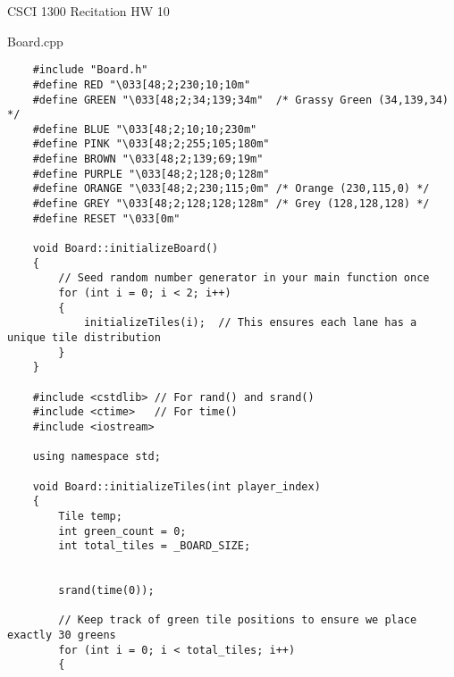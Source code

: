 \documentclass{article}
\begin{document}
CSCI 1300 Recitation HW 10

\vspace{1cm}

Board.cpp

\begin{verbatim}
    #include "Board.h"
    #define RED "\033[48;2;230;10;10m"
    #define GREEN "\033[48;2;34;139;34m"  /* Grassy Green (34,139,34) */
    #define BLUE "\033[48;2;10;10;230m"
    #define PINK "\033[48;2;255;105;180m"
    #define BROWN "\033[48;2;139;69;19m"
    #define PURPLE "\033[48;2;128;0;128m"
    #define ORANGE "\033[48;2;230;115;0m" /* Orange (230,115,0) */
    #define GREY "\033[48;2;128;128;128m" /* Grey (128,128,128) */
    #define RESET "\033[0m"
    
    void Board::initializeBoard()
    {
        // Seed random number generator in your main function once
        for (int i = 0; i < 2; i++)
        {
            initializeTiles(i);  // This ensures each lane has a unique tile distribution
        }
    }
    
    #include <cstdlib> // For rand() and srand()
    #include <ctime>   // For time()
    #include <iostream>
    
    using namespace std;
    
    void Board::initializeTiles(int player_index)
    {
        Tile temp;
        int green_count = 0;
        int total_tiles = _BOARD_SIZE;
        
    
        srand(time(0));
        
        // Keep track of green tile positions to ensure we place exactly 30 greens
        for (int i = 0; i < total_tiles; i++)
        {
            

\end{verbatim}
\end{document}
